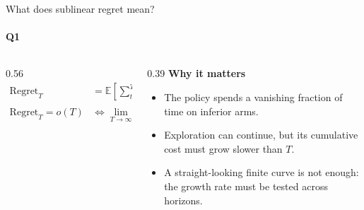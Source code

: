 \begin{frame}{What does sublinear regret mean?}
  \framesubtitle{Q1}
  \vspace{0.08cm}
  \begin{columns}[T,onlytextwidth]
    \begin{column}{0.56\textwidth}
      {\fontsize{11.8}{14.5}\selectfont
      \begin{align*}
        \mathrm{Regret}_T
          &= \mathbb{E}\!\left[\sum_{t=0}^{T-1}
             \bigl(q_*(a_*)-q_*(A_t)\bigr)\right],\\[0.18cm]
        \mathrm{Regret}_T=o(T)
          &\iff \lim_{T\to\infty}\frac{\mathrm{Regret}_T}{T}=0.
      \end{align*}}
      \vspace{0.06cm}
    \end{column}
    \begin{column}{0.39\textwidth}
      \textbf{Why it matters}
      \vspace{0.12cm}
      \begin{itemize}
        \item The policy spends a vanishing fraction of time on inferior arms.
        \item Exploration can continue, but its cumulative cost must grow slower than \(T\).
        \item A straight-looking finite curve is not enough: the growth rate must be tested across horizons.
      \end{itemize}
    \end{column}
  \end{columns}
  \vfill
\end{frame}
